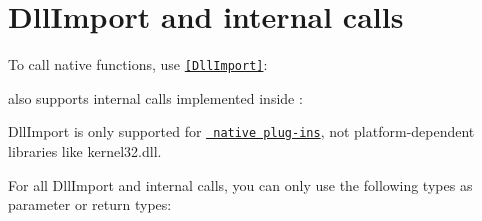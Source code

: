 \chapter{Dll\+Import and internal calls}
\hypertarget{md__hey_tea_9_2_library_2_package_cache_2com_8unity_8burst_0d1_88_87_2_documentation_0i_2csharp-burst-intrinsics-dllimport}{}\label{md__hey_tea_9_2_library_2_package_cache_2com_8unity_8burst_0d1_88_87_2_documentation_0i_2csharp-burst-intrinsics-dllimport}
\label{md__hey_tea_9_2_library_2_package_cache_2com_8unity_8burst_0d1_88_87_2_documentation_0i_2csharp-burst-intrinsics-dllimport_autotoc_md319}%
%
 To call native functions, use \href{https://docs.microsoft.com/en-us/dotnet/api/system.runtime.interopservices.dllimportattribute?view=net-6.0}{\texttt{ {\ttfamily \mbox{[}Dll\+Import\mbox{]}}}}\+:


\begin{DoxyCode}{0}
\DoxyCodeLine{\textcolor{preprocessor}{\ \#}}

\end{DoxyCode}


 also supports internal calls implemented inside \+:


\begin{DoxyCode}{0}
\DoxyCodeLine{\textcolor{preprocessor}{\ \#}}
\DoxyCodeLine{\textcolor{comment}{//\ In\ UnityEngine.Mathf}}

\end{DoxyCode}


{\ttfamily Dll\+Import} is only supported for \href{https://docs.unity3d.com/Manual/NativePlugins.html}{\texttt{ native plug-\/ins}}, not platform-\/dependent libraries like {\ttfamily kernel32.\+dll}.

For all {\ttfamily Dll\+Import} and internal calls, you can only use the following types as parameter or return types\+:

